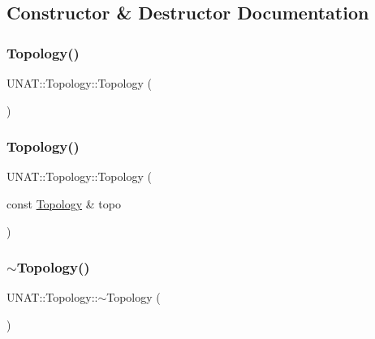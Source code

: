 \subsection{Constructor \& Destructor Documentation}
\mbox{\label{classUNAT_1_1Topology_abca137a381a1bdd9c44afa3056f1d45b}} 
\subsubsection{\texorpdfstring{Topology()}{Topology()}\hspace{0.1cm}{\footnotesize\ttfamily [1/6]}}
{\footnotesize\ttfamily U\+N\+A\+T\+::\+Topology\+::\+Topology (\begin{DoxyParamCaption}{ }\end{DoxyParamCaption})}

\mbox{\label{classUNAT_1_1Topology_ae1c53ba557ce7d0c587dd46d1eb2b018}} 
\subsubsection{\texorpdfstring{Topology()}{Topology()}\hspace{0.1cm}{\footnotesize\ttfamily [2/6]}}
{\footnotesize\ttfamily U\+N\+A\+T\+::\+Topology\+::\+Topology (\begin{DoxyParamCaption}\item[{const \mbox{\hyperlink{classUNAT_1_1Topology}{Topology}} \&}]{topo }\end{DoxyParamCaption})}

\mbox{\label{classUNAT_1_1Topology_a136b0445c89509d4d087a958b58e0d62}} 
\subsubsection{\texorpdfstring{$\sim$Topology()}{~Topology()}\hspace{0.1cm}{\footnotesize\ttfamily [1/3]}}
{\footnotesize\ttfamily U\+N\+A\+T\+::\+Topology\+::$\sim$\+Topology (\begin{DoxyParamCaption}{ }\end{DoxyParamCaption})}

